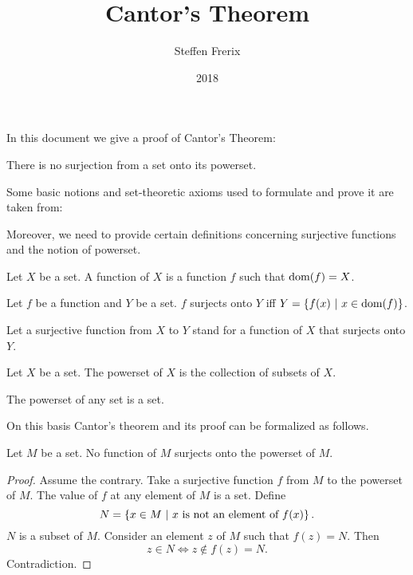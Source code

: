 \documentclass{article}
\title{Cantor's Theorem}
\author{Steffen Frerix}
\date{2018}
\begin{document}

\maketitle

\noindent
In this document we give a proof of Cantor's Theorem:

\begin{theorem*}
  There is no surjection from a set onto its powerset.
\end{theorem*}

Some basic notions and set-theoretic axioms used to formulate and prove it are
taken from:

\begin{forthel}
\end{forthel}

Moreover, we need to provide certain definitions concerning surjective
functions and the notion of powerset.

\begin{forthel}
  \begin{definition*}
    Let $X$ be a set.
    A function of $X$ is a function $f$ such that $\textrm{dom}(f) = X$.
  \end{definition*}

  \begin{definition*}
    Let $f$ be a function and $Y$ be a set.
    $f$ surjects onto $Y$ iff $Y = \class{f(x) | x \in \dom(f)}$.
  \end{definition*}

  Let a surjective function from $X$ to $Y$ stand for a function of $X$ that
  surjects onto $Y$.
  \begin{definition*}
    Let $X$ be a set.
    The powerset of $X$ is the collection of subsets of $X$.
  \end{definition*}
  
  \begin{axiom*}
    The powerset of any set is a set.
  \end{axiom*}
\end{forthel}

On this basis Cantor's theorem and its proof can be formalized as follows.

\begin{forthel}
  \begin{theorem*}[Cantor]
    Let $M$ be a set.
    No function of $M$ surjects onto the powerset of $M$.
  \end{theorem*}
  \begin{proof}
    Assume the contrary.
    Take a surjective function $f$ from $M$ to the powerset of $M$.
    The value of $f$ at any element of $M$ is a set.
    Define \[ N = \class{x \in M | x \text{ is not an element of } f(x)}. \]
    $N$ is a subset of $M$.
    Consider an element $z$ of $M$ such that $f(z) = N$.
    Then \[ z \in N \iff z \notin f(z) = N. \]
    Contradiction.
  \end{proof}
\end{forthel}
\end{document}

